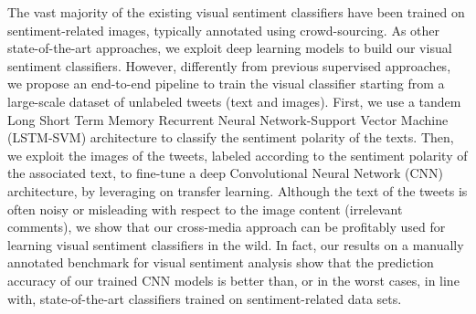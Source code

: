 The vast majority of the existing visual sentiment classifiers have been trained on sentiment-related images, typically annotated using crowd-sourcing. %
As other state-of-the-art approaches, we exploit deep learning models to build our visual sentiment classifiers.
However, differently from previous supervised approaches, we propose an end-to-end pipeline to train the visual classifier starting from a large-scale dataset of unlabeled tweets (text and images). %
First, we use a tandem Long Short Term Memory Recurrent Neural Network-Support Vector Machine (LSTM-SVM) architecture to classify the sentiment polarity of the texts.
Then, we exploit the images of the tweets, labeled according to the sentiment polarity of the associated text, to fine-tune a deep Convolutional Neural Network (CNN) architecture, by leveraging on transfer learning.
Although the text of the tweets is often noisy or misleading with respect to the image content (\eg irrelevant comments), we show that our cross-media approach can be profitably used for learning visual sentiment classifiers in the wild.
In fact, our results on a manually annotated benchmark for visual sentiment analysis %
show that the prediction accuracy of our trained CNN models is better than, or in the worst cases, in line with, state-of-the-art classifiers trained on sentiment-related data sets. %

